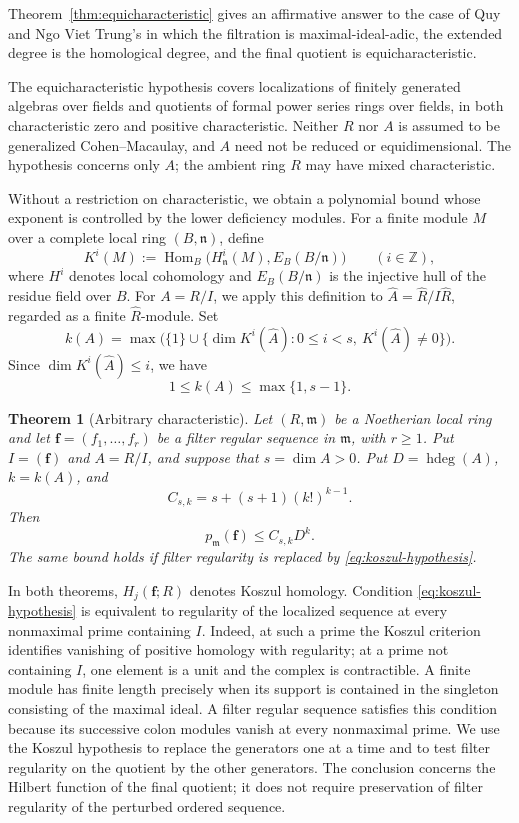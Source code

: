 \documentclass[11pt,reqno]{amsart}
\numberwithin{equation}{section}
\newtheorem{theorem}{Theorem}[section]
\theoremstyle{definition}
\newcommand{\m}{\mathfrak m}
\newcommand{\f}{\mathbf f}
\newcommand{\hdeg}{\operatorname{hdeg}}
\begin{document}
Theorem~\ref{thm:equicharacteristic} gives an affirmative answer to
the case of Quy and Ngo Viet Trung's \cite[Question~4.9]{QT} in which
the filtration is maximal-ideal-adic, the extended degree is the
homological degree, and the final quotient is equicharacteristic.

The equicharacteristic hypothesis covers localizations of finitely
generated algebras over fields and quotients of formal power series
rings over fields, in both characteristic zero and positive
characteristic. Neither $R$ nor $A$ is assumed to be generalized
Cohen--Macaulay, and $A$ need not be reduced or equidimensional.
The hypothesis concerns only $A$; the ambient ring $R$ may have
mixed characteristic.

Without a restriction on characteristic, we obtain a polynomial bound
whose exponent is controlled by the lower deficiency modules.
For a finite module $M$ over a complete local ring $(B,\mathfrak n)$,
define
\[
 K^i(M):=\operatorname{Hom}_B
 \bigl(H^i_{\mathfrak n}(M),E_B(B/\mathfrak n)\bigr)
 \qquad(i\in\mathbb Z),
\]
where $H^i$ denotes local cohomology and $E_B(B/\mathfrak n)$ is
the injective hull of the residue field over $B$.
For $A=R/I$, we apply this definition to
$\widehat A=\widehat R/I\widehat R$, regarded as a finite
$\widehat R$-module. Set
\begin{equation}\label{eq:k-definition}
 k(A)=\max\bigl(\{1\}\cup
       \{\dim K^i(\widehat A):0\le i<s,\ K^i(\widehat A)\ne0\}\bigr).
\end{equation}
Since $\dim K^i(\widehat A)\le i$, we have
\[
 1\le k(A)\le\max\{1,s-1\}.
\]

\begin{theorem}[Arbitrary characteristic]\label{thm:main}
Let $(R,\m)$ be a Noetherian local ring and let $\f=(f_1,\ldots,f_r)$
be a filter regular sequence in $\m$, with $r\ge1$.
Put $I=(\f)$ and $A=R/I$, and suppose that $s=\dim A>0$.
Put $D=\hdeg(A)$, $k=k(A)$, and
\[
 C_{s,k}=s+(s+1)(k!)^{k-1}.
\]
Then
\[
 p_{\m}(\f)\le C_{s,k}D^k.
\]
The same bound holds if filter regularity is replaced by
\eqref{eq:koszul-hypothesis}.
\end{theorem}

In both theorems, $H_j(\f;R)$ denotes Koszul homology. Condition
\eqref{eq:koszul-hypothesis} is equivalent to regularity of the
localized sequence at every nonmaximal prime containing $I$.
Indeed, at such a prime the Koszul criterion identifies vanishing
of positive homology with regularity; at a prime not containing $I$,
one element is a unit and the complex is contractible. A finite
module has finite length precisely when its support is contained
in the singleton consisting of the maximal ideal. A filter regular
sequence satisfies this condition because its successive colon
modules vanish at every nonmaximal prime. We use the Koszul
hypothesis to replace the generators one at a time and to test
filter regularity on the quotient by the other generators.
The conclusion concerns the Hilbert function of the final quotient;
it does not require preservation of filter regularity of the
perturbed ordered sequence.
\end{document}
